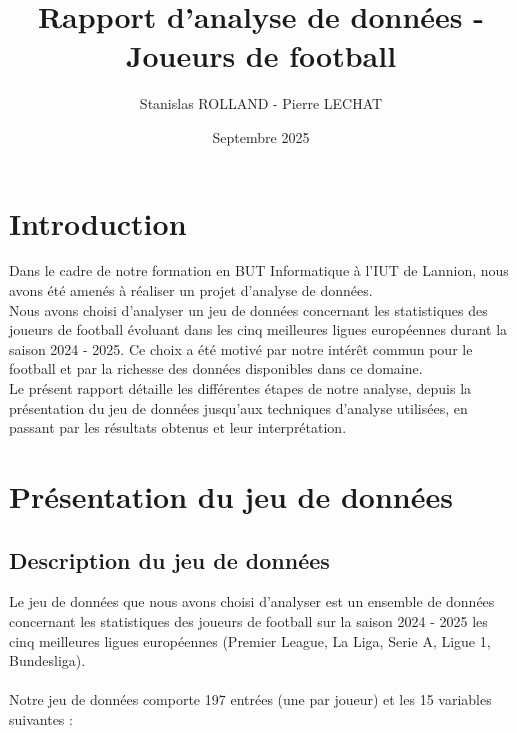 \documentclass[11pt]{scrartcl}
\title{Rapport d'analyse de données - Joueurs de football}
\author{Stanislas ROLLAND - Pierre LECHAT}
\date{Septembre 2025}
\begin{document}
    \maketitle
    \tableofcontents  
    \newpage
 



    \section{Introduction}

        Dans le cadre de notre formation en BUT Informatique à l'IUT de Lannion, nous avons été amenés à réaliser un projet d'analyse de données.\\

        Nous avons choisi d'analyser un jeu de données concernant les statistiques des joueurs de football évoluant dans les cinq meilleures ligues européennes durant la saison 2024 - 2025. Ce choix a été motivé par notre intérêt commun pour le football et par la richesse des données disponibles dans ce domaine.\\

        Le présent rapport détaille les différentes étapes de notre analyse, depuis la présentation du jeu de données jusqu'aux techniques d'analyse utilisées, en passant par les résultats obtenus et leur interprétation.




    \section{Présentation du jeu de données}

        \subsection{Description du jeu de données}
        Le jeu de données que nous avons choisi d'analyser est un ensemble de données concernant les statistiques des joueurs de football sur la saison 2024 - 2025 les cinq meilleures ligues européennes (Premier League, La Liga, Serie A, Ligue 1, Bundesliga).\\\\
        Notre jeu de données comporte 197 entrées (une par joueur) et les 15 variables suivantes :
\end{document}
